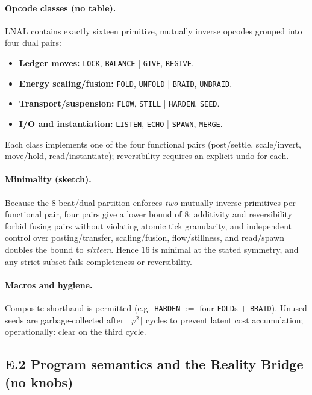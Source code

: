 \documentclass[11pt]{article}
\begin{document}
\begin{proposition}
\paragraph{Opcode classes (no table).}
LNAL contains exactly sixteen primitive, mutually inverse opcodes grouped into four dual pairs:
\begin{itemize}
  \item \textbf{Ledger moves:} \texttt{LOCK}, \texttt{BALANCE} \;|\; \texttt{GIVE}, \texttt{REGIVE}.
  \item \textbf{Energy scaling/fusion:} \texttt{FOLD}, \texttt{UNFOLD} \;|\; \texttt{BRAID}, \texttt{UNBRAID}.
  \item \textbf{Transport/suspension:} \texttt{FLOW}, \texttt{STILL} \;|\; \texttt{HARDEN}, \texttt{SEED}.
  \item \textbf{I/O and instantiation:} \texttt{LISTEN}, \texttt{ECHO} \;|\; \texttt{SPAWN}, \texttt{MERGE}.
\end{itemize}
Each class implements one of the four functional pairs (post/settle, scale/invert, move/hold, read/instantiate); reversibility requires an explicit undo for each.

\paragraph{Minimality (sketch).}
Because the 8‑beat/dual partition enforces \emph{two} mutually inverse primitives per functional pair, four pairs give a lower bound of $8$; additivity and reversibility forbid fusing pairs without violating atomic tick granularity, and independent control over posting/transfer, scaling/fusion, flow/stillness, and read/spawn doubles the bound to \emph{sixteen}. Hence $16$ is minimal at the stated symmetry, and any strict subset fails completeness or reversibility.

\paragraph{Macros and hygiene.}
Composite shorthand is permitted (e.g.\ \texttt{HARDEN} $:=$ four \texttt{FOLD}s $+$ \texttt{BRAID}). Unused seeds are garbage‑collected after $\lceil\varphi^{2}\rceil$ cycles to prevent latent cost accumulation; operationally: clear on the third cycle.

\subsection*{E.2  Program semantics and the Reality Bridge (no knobs)}


\end{proposition}
\end{document}
